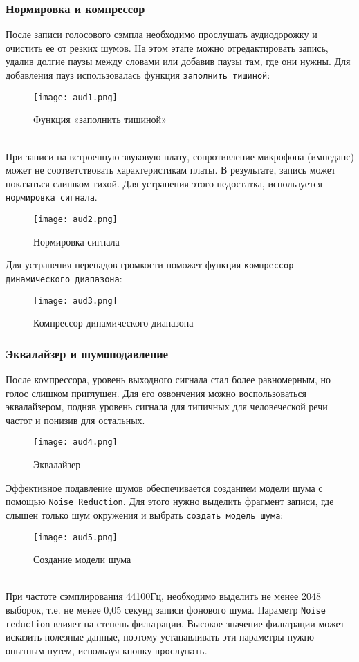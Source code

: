 \documentclass[a4paper]{article}
\begin{document}
\subsubsection{Нормировка и компрессор}

После записи голосового сэмпла необходимо прослушать аудиодорожку и очистить ее от резких шумов. На этом этапе можно отредактировать запись, удалив долгие паузы между словами или добавив паузы там, где они нужны.
Для добавления пауз использовалась функция \lstinline{заполнить тишиной}:\\
\begin{figure}[h]
	\centering
	\texttt{[image: aud1.png]}
	\caption{Функция «заполнить тишиной»}
	\label{fig:mesh2}
\end{figure}\\
При записи на встроенную звуковую плату, сопротивление микрофона (импеданс) может не соответствовать характеристикам платы. В результате, запись может показаться слишком тихой. Для устранения этого недостатка, используется \lstinline{нормировка сигнала}. \\
\begin{figure}[h]
	\centering
	\texttt{[image: aud2.png]}
	\caption{Нормировка сигнала}
	\label{fig:mesh3}
\end{figure}
\thispagestyle{empty}

\newpage
Для устранения перепадов громкости поможет функция \lstinline{компрессор динамического диапазона}:
\begin{figure}[h]
	\centering
	\texttt{[image: aud3.png]}
	\caption{Компрессор динамического диапазона}
	\label{fig:mesh4}
\end{figure}
\subsubsection{Эквалайзер и шумоподавление}
После компрессора, уровень выходного сигнала стал более равномерным, но голос слишком приглушен. Для его озвончения можно воспользоваться эквалайзером, подняв уровень сигнала для типичных для человеческой речи частот и понизив для остальных.
\begin{figure}[h]
	\centering
	\texttt{[image: aud4.png]}
	\caption{Эквалайзер}
	\label{fig:mesh5}
\end{figure}
\thispagestyle{empty}

\newpage
Эффективное подавление шумов обеспечивается созданием модели шума с помощью \lstinline{Noise Reduction}. Для этого нужно выделить фрагмент записи, где слышен только шум окружения и выбрать \lstinline{создать модель шума}:
\begin{figure}[h]
	\centering
	\texttt{[image: aud5.png]}
	\caption{Создание модели шума}
	\label{fig:mesh6}
\end{figure}
\\При частоте сэмплирования 44100Гц, необходимо выделить не менее 2048 выборок, т.е. не менее 0,05 секунд записи фонового шума. Параметр \lstinline{Noise reduction} влияет на степень фильтрации. Высокое значение фильтрации может исказить полезные данные, поэтому устанавливать эти параметры нужно опытным путем, используя кнопку \lstinline{прослушать}.
\end{document}
